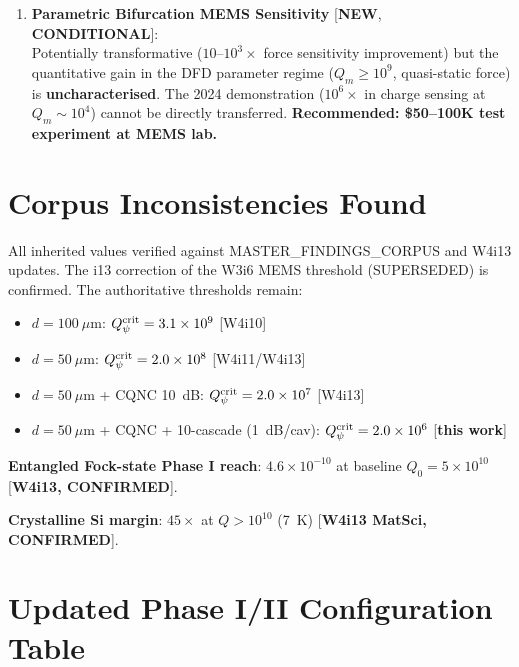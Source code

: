 \documentclass[11pt]{article}
\newcommand{\ee}[1]{\times 10^{#1}}
\newcommand{\Qpsi}{Q_\psi}
\theoremstyle{definition}
\theoremstyle{remark}
\begin{document}
\begin{tcolorbox}[colback=green!5!white, colframe=green!50!black,
  title=\textbf{W4i14 FINDINGS RANKED BY PROGRAMME IMPACT}]
\begin{enumerate}
\item \textbf{Parametric Bifurcation MEMS Sensitivity}
  [\textbf{NEW}, \textbf{CONDITIONAL}]:\\
  Potentially transformative ($10$--$10^3\times$ force sensitivity
  improvement) but the quantitative gain in the DFD parameter regime
  ($Q_m \geq 10^9$, quasi-static force) is \textbf{uncharacterised}.
  The 2024 demonstration ($10^6\times$ in charge sensing at $Q_m
  \sim 10^4$) cannot be directly transferred. \textbf{Recommended:
  \$50--100K test experiment at MEMS lab.}

\end{enumerate}
\end{tcolorbox}


\section*{Corpus Inconsistencies Found}

\begin{tcolorbox}[colback=green!5!white, colframe=green!50!black,
  title=\textbf{NO NEW CORPUS INCONSISTENCIES}]
All inherited values verified against MASTER\_FINDINGS\_CORPUS and
W4i13 updates. The i13 correction of the W3i6 MEMS threshold
(SUPERSEDED) is confirmed. The authoritative thresholds remain:
\begin{itemize}[nosep]
\item $d = 100~\mu$m: $\Qpsi^{\rm crit} = 3.1\ee{9}$ [W4i10]
\item $d = 50~\mu$m: $\Qpsi^{\rm crit} = 2.0\ee{8}$ [W4i11/W4i13]
\item $d = 50~\mu$m + CQNC 10~dB: $\Qpsi^{\rm crit} = 2.0\ee{7}$ [W4i13]
\item $d = 50~\mu$m + CQNC + 10-cascade (1~dB/cav):
  $\Qpsi^{\rm crit} = 2.0\ee{6}$ [\textbf{this work}]
\end{itemize}

\textbf{Entangled Fock-state Phase I reach}: $4.6\ee{-10}$ at
baseline $Q_0 = 5\ee{10}$ [\textbf{W4i13, CONFIRMED}].

\textbf{Crystalline Si margin}: $45\times$ at $Q > 10^{10}$ (7~K)
[\textbf{W4i13 MatSci, CONFIRMED}].
\end{tcolorbox}


\section*{Updated Phase I/II Configuration Table}
\end{document}
